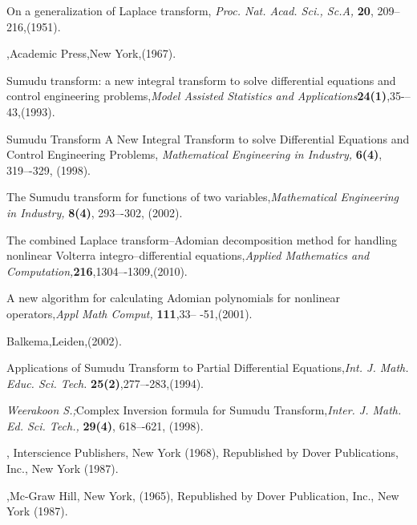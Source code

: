 \begin{thebibliography}{00}
On a generalization of Laplace transform, {\it Proc. Nat. Acad. Sci.,
Sc.A,} {\bf 20}, 209--216,(1951).

,Academic Press,New York,(1967).

Sumudu transform: a new integral transform to solve differential equations and control engineering problems,{\it  Model Assisted Statistics and Applications}{\bf 24(1)},35-–43,(1993).

Sumudu Transform A New Integral Transform to solve Differential Equations and Control Engineering Problems, {\it Mathematical Engineering in Industry,} {\bf 6(4)}, 319–-329, (1998).

The Sumudu transform for functions of two variables,{\it Mathematical Engineering in Industry,} {\bf 8(4)}, 293–-302, (2002).

 The combined Laplace transform–Adomian decomposition method
for handling nonlinear Volterra integro–differential equations,{\it Applied Mathematics and Computation,}{\bf 216},1304–-1309,(2010).

 A new algorithm for calculating Adomian polynomials for nonlinear operators,{\it Appl Math Comput,} {\bf 111},33–
-51,(2001).

Balkema,Leiden,(2002).
 

Applications of Sumudu Transform to Partial Differential
Equations,{\it Int. J. Math. Educ. Sci. Tech.} {\bf 25(2)},277–-283,(1994).
 
 {\sl Weerakoon S.;}Complex Inversion formula for Sumudu Transform,{\it Inter. J.
Math. Ed. Sci. Tech.,} {\bf 29(4)}, 618–-621, (1998).


, Interscience Publishers, New York (1968), Republished by Dover Publications, Inc., New York (1987).

,Mc-Graw Hill, New York, (1965), Republished by Dover Publication, Inc., New York (1987).
\end{thebibliography}




























